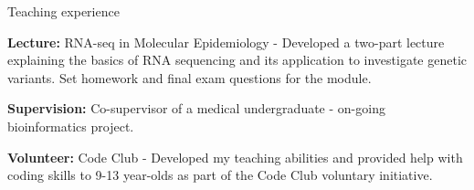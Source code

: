 \documentclass{resume}
\begin{document}
\begin{rSection}{Teaching experience}

\item \textbf{Lecture:} RNA-seq in Molecular Epidemiology - Developed a two-part lecture explaining the basics of RNA sequencing and its application to investigate genetic variants. Set homework and final exam questions for the module.
\vspace{2pt plus 1pt minus 1pt}

\item \textbf{Supervision:} Co-supervisor of a medical undergraduate - on-going bioinformatics project.

\vspace{2pt plus 1pt minus 1pt}

\item \textbf{Volunteer:} Code Club - Developed my teaching abilities and provided help with coding skills to 9-13 year-olds as part of the Code Club voluntary initiative.
\vspace{2pt plus 1pt minus 1pt}

\end{rSection}
\end{document}
